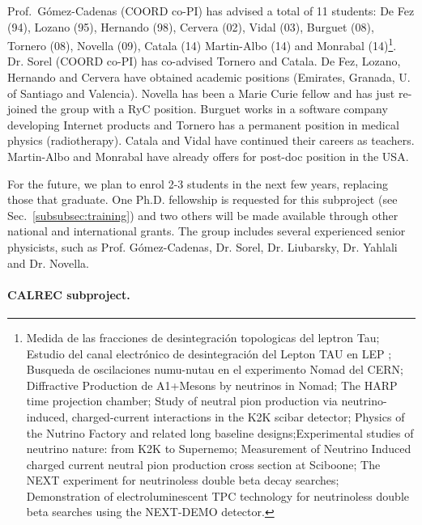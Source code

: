Prof.~G\'omez-Cadenas (COORD co-PI) has advised a total of 11 students: De Fez (94), Lozano (95), Hernando (98), Cervera (02), Vidal (03), Burguet (08), Tornero (08), Novella (09), Catala (14) Martin-Albo (14) and Monrabal (14)\footnote{Medida de las fracciones de desintegración topologicas del leptron Tau; Estudio del canal electrónico de desintegración del Lepton TAU en LEP ; Busqueda de oscilaciones numu-nutau en el experimento Nomad del CERN; Diffractive Production de A1+Mesons by neutrinos in Nomad; The HARP time projection chamber; Study of neutral pion production via neutrino-induced, charged-current interactions in the K2K scibar detector; Physics of the Nutrino Factory and related long baseline designs;Experimental studies of neutrino nature: from K2K to Supernemo; Measurement of Neutrino Induced charged current neutral pion production cross section at Sciboone; The NEXT experiment for neutrinoless double beta decay searches; Demonstration of electroluminescent TPC technology for neutrinoless double beta searches using the NEXT-DEMO detector.}. Dr. Sorel (COORD co-PI) has co-advised Tornero and Catala. De Fez, Lozano, Hernando and Cervera have obtained academic positions (Emirates, Granada, U. of Santiago and Valencia). Novella has been a Marie Curie fellow and has just re-joined the group with a RyC position. Burguet works in a software company developing Internet products and Tornero has a permanent position in medical physics (radiotherapy). Catala and Vidal have continued their careers as teachers. Martin-Albo and Monrabal have already offers for post-doc position in the USA.

For the future, we plan to enrol 2-3 students in the next few years, replacing those that graduate. One Ph.D. fellowship is requested for this subproject (see Sec.~\ref{subsubsec:training}) and two others will be made available through other national and international grants. The group includes several experienced senior physicists, such as Prof. G\'omez-Cadenas, Dr. Sorel, Dr. Liubarsky, Dr. Yahlali and Dr. Novella. 

\paragraph{CALREC subproject.}


